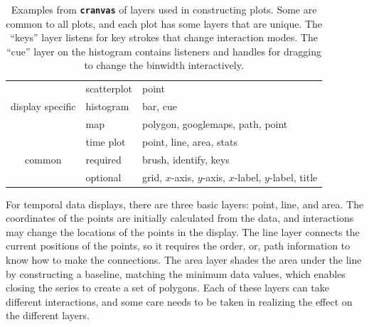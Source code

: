 \documentclass[12pt]{article}
\providecommand{\tabularnewline}{\\}
\begin{document}
\begin{center}
\begin{table}[h]
\begin{center}
\begin{tabular}{c|l|l}
\hline
  & scatterplot & point\tabularnewline
\cline{2-3}
display specific & histogram & bar, cue\tabularnewline
\cline{2-3}
 & map & polygon, googlemaps, path, point\tabularnewline
\cline{2-3}
 & time plot & point, line, area, stats\tabularnewline
\hline
common & required & brush, identify, keys\tabularnewline
\cline{2-3}
 & optional & grid, $x$-axis, $y$-axis, $x$-label, $y$-label, title \tabularnewline
\hline
\end{tabular}
\end{center}

\caption{\label{tab:Layers}Examples from \texttt{\textbf{cranvas}}
of layers used in constructing plots. Some are common to all plots,
and each plot has some layers that are unique. The ``keys'' layer
listens for key strokes that change interaction modes. The ``cue''
layer on the histogram contains listeners and handles for dragging
to change the binwidth interactively.}
\end{table}

\end{center}






For temporal data displays, there are three basic layers: point, line, and area. The coordinates of the points are initially calculated from the data, and interactions may change the locations of the points in the display. The line layer connects the current positions of the points, so it requires the order, or, path information to know how to make the connections. The area layer shades the area under the line by constructing a baseline, matching the minimum data values, which enables closing the series to create a set of polygons.  %
Each of these layers can take different interactions, and some care needs to be taken in realizing the effect on the different layers.
\end{document}

